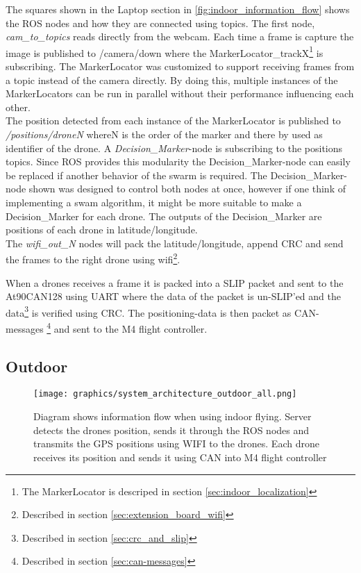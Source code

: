 The squares shown in the Laptop section in \ref{fig:indoor_information_flow} shows the ROS nodes and how they are connected using topics. 
The first node, \textit{cam\_to\_topics} reads directly from the webcam. Each time a frame is capture the image is published to /camera/down where the MarkerLocator\_trackX\footnote{The MarkerLocator is descriped in section \ref{sec:indoor_localization}} is subscribing. The MarkerLocator was customized to support receiving frames from a topic instead of the camera directly. By doing this, multiple instances of the MarkerLocators can be run in parallel without their performance influencing each other.\\

The position detected from each instance of the MarkerLocator is published to \textit{/positions/droneN} whereN is the order of the marker and there by used as identifier of the drone. A \textit{Decision\_Marker}-node is subscribing to the positions topics.
Since ROS provides this modularity the Decision\_Marker-node can easily be replaced if another behavior of the swarm is required.
The Decision\_Marker-node shown was designed to control both nodes at once, however if one think of implementing a swam algorithm, it might be more suitable to make a Decision\_Marker for each drone. The outputs of the Decision\_Marker are positions of each drone in latitude/longitude.\\
The \textit{wifi\_out\_N} nodes will pack the latitude/longitude, append CRC and send the frames to the right drone using wifi\footnote{Described in section \ref{sec:extension_board_wifi}}. \

When a drones receives a frame it is packed into a SLIP packet and sent to the At90CAN128 using UART where the data of the packet is un-SLIP'ed and the data\footnote{Described in section \ref{sec:crc_and_slip}} is verified using CRC. The positioning-data is then packet as CAN-messages \footnote{Described in section \ref{sec:can-messages}} and sent to the M4 flight controller.


\subsection{Outdoor}
\begin{figure}[H]
    \center
    \texttt{[image: graphics/system\_architecture\_outdoor\_all.png]}
    \caption{Diagram shows information flow when using indoor flying. Server detects the drones position, sends it through the ROS nodes and transmits the GPS positions using WIFI to the drones. Each drone receives its position and sends it using CAN into M4 flight controller}
    \label{fig:outdoor_information_flow}
\end{figure}

